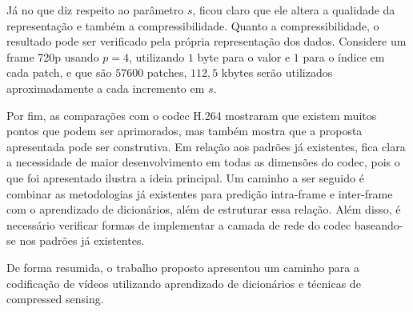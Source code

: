 \documentclass[cic,tc]{iiufrgs}
\begin{document}
Já no que diz respeito ao parâmetro $s$, ficou claro que ele altera a qualidade da representação 
e também a compressibilidade.
Quanto a compressibilidade, o resultado pode ser verificado pela própria representação dos dados.
Considere um frame 720p usando $p=4$, utilizando $1$ byte para o valor e $1$ para o índice em cada 
patch, e que são $57600$ patches, $112,5$ kbytes serão utilizados aproximadamente a cada incremento
em $s$.

Por fim, as comparações com o codec H.264 mostraram que existem muitos pontos que podem ser 
aprimorados, mas também mostra que a proposta apresentada pode ser construtiva.
Em relação aos padrões já existentes, fica clara a necessidade de maior desenvolvimento em 
todas as dimensões do codec, pois o que foi apresentado ilustra a ideia principal.
Um caminho a ser seguido é combinar as metodologias já existentes para predição intra-frame 
e inter-frame com o aprendizado de dicionários, além de estruturar essa relação.
Além disso, é necessário verificar formas de implementar a camada de rede do codec baseando-se 
nos padrões já existentes.

De forma resumida, o trabalho proposto apresentou um caminho para a codificação de vídeos 
utilizando aprendizado de dicionários e técnicas de compressed sensing.


% 



\end{document}
